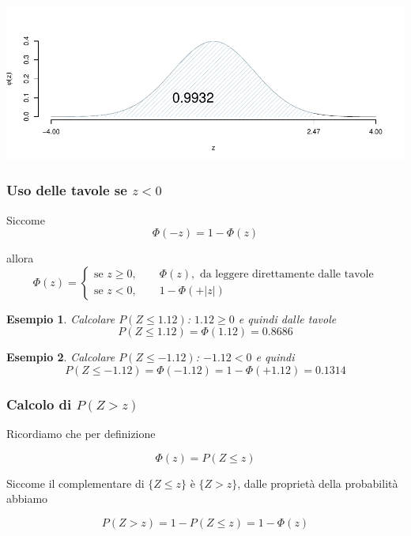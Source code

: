 \documentclass[
  11pt,
]{book}
\theoremstyle{mytheoremstyle}
\theoremstyle{mydefstyle}
\newtheorem{example}{{Esempio}}[section]
\begin{document}
\begin{center}\includegraphics{Appunti_di_Statistica_2025_files/figure-latex/07c-Normale-15-1} \end{center}

\subsubsection{\texorpdfstring{Uso delle tavole se \(z<0\)}{Uso delle tavole se z\textless0}}\label{uso-delle-tavole-se-z0}

Siccome
\[\Phi(-z)=1-\Phi(z)\]

allora
\[\Phi(z)=\begin{cases}
\text{se }z\geq 0, \qquad \Phi(z),\text{ da leggere direttamente dalle tavole}\\
\text{se } z < 0, \qquad 1-\Phi(+|z|)
\end{cases}\]

\begin{example}
Calcolare \(P(Z\leq 1.12)\): \(1.12\geq 0\) e quindi dalle tavole
\[P(Z\leq 1.12)=\Phi(1.12)=0.8686\]
\end{example}

\begin{example}
Calcolare \(P(Z\leq -1.12)\): \(-1.12< 0\) e quindi
\[P(Z\leq -1.12)=\Phi(-1.12)=1-\Phi(+1.12)=0.1314\]
\end{example}

\subsubsection{\texorpdfstring{Calcolo di \(P(Z>z)\)}{Calcolo di P(Z\textgreater z)}}\label{calcolo-di-pzz}

Ricordiamo che per definizione

\[\Phi(z)=P(Z\leq z)\]

Siccome il complementare di \(\{Z\leq z\}\) è \(\{Z> z\}\), dalle proprietà della probabilità abbiamo

\[P(Z>z)=1-P(Z\leq z)=1-\Phi(z)\]
\end{document}
